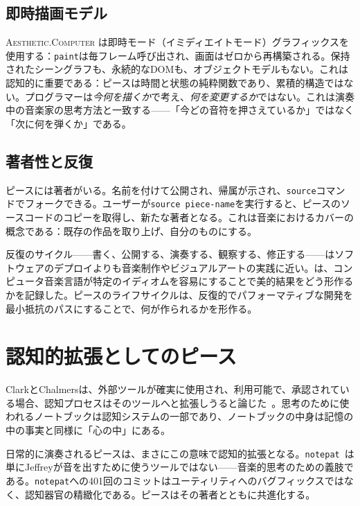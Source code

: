 \documentclass[10pt,letterpaper,twocolumn]{article}
\newcommand{\ac}{\textsc{Aesthetic.Computer}}
\begin{document}
\subsection{即時描画モデル}

\ac{} は即時モード（イミディエイトモード）グラフィックスを使用する：\texttt{paint}は毎フレーム呼び出され、画面はゼロから再構築される。保持されたシーングラフも、永続的なDOMも、オブジェクトモデルもない。これは認知的に重要である：ピースは時間と状態の純粋関数であり、累積的構造ではない。プログラマーは\emph{今何を描くか}で考え、\emph{何を変更するか}ではない。これは演奏中の音楽家の思考方法と一致する——「今どの音符を押さえているか」ではなく「次に何を弾くか」である。

\subsection{著者性と反復}

ピースには著者がいる。名前を付けて公開され、帰属が示され、\texttt{source}コマンドでフォークできる。ユーザーが\texttt{source piece-name}を実行すると、ピースのソースコードのコピーを取得し、新たな著者となる。これは音楽におけるカバーの概念である：既存の作品を取り上げ、自分のものにする。

反復のサイクル——書く、公開する、演奏する、観察する、修正する——はソフトウェアのデプロイよりも音楽制作やビジュアルアートの実践に近い。\citet{mcpherson2020idiomatic}は、コンピュータ音楽言語が特定のイディオムを容易にすることで美的結果をどう形作るかを記録した。ピースのライフサイクルは、反復的でパフォーマティブな開発を最小抵抗のパスにすることで、何が作られるかを形作る。

\section{認知的拡張としてのピース}

ClarkとChalmersは、外部ツールが確実に使用され、利用可能で、承認されている場合、認知プロセスはそのツールへと拡張しうると論じた~\citep{clark1998extended}。思考のために使われるノートブックは認知システムの一部であり、ノートブックの中身は記憶の中の事実と同様に「心の中」にある。

日常的に演奏されるピースは、まさにこの意味で認知的拡張となる。\texttt{notepat}~\citep{scudder2026notepat}は単にJeffreyが音を出すために使うツールではない——音楽的思考のための義肢である。\texttt{notepat}への401回のコミットはユーティリティへのバグフィックスではなく、認知器官の精緻化である。ピースはその著者とともに共進化する。
\end{document}
